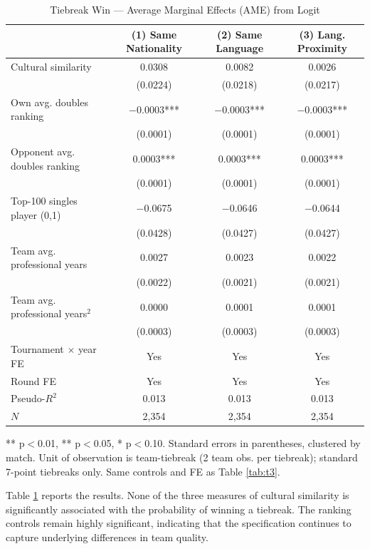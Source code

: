 \documentclass[10pt]{article}
\begin{document}
\begin{table}[htbp]
\color{blue}
\centering
\caption{Tiebreak Win — Average Marginal Effects (AME) from Logit \label{tab:t4}}
\begin{threeparttable}
\begin{tabular}{lccc}
\toprule
 & (1) Same Nationality & (2) Same Language & (3) Lang. Proximity \\
\midrule
Cultural similarity & 0.0308 & 0.0082 & 0.0026 \\
 & (0.0224) & (0.0218) & (0.0217) \\
Own avg. doubles ranking & $-$0.0003*** & $-$0.0003*** & $-$0.0003*** \\
 & (0.0001) & (0.0001) & (0.0001) \\
Opponent avg. doubles ranking & 0.0003*** & 0.0003*** & 0.0003*** \\
 & (0.0001) & (0.0001) & (0.0001) \\
Top-100 singles player (0,1) & $-$0.0675 & $-$0.0646 & $-$0.0644 \\
 & (0.0428) & (0.0427) & (0.0427) \\
Team avg. professional years & 0.0027 & 0.0023 & 0.0022 \\
 & (0.0022) & (0.0021) & (0.0021) \\
Team avg. professional years$^2$ & 0.0000 & 0.0001 & 0.0001 \\
 & (0.0003) & (0.0003) & (0.0003) \\
\midrule
Tournament $\times$ year FE & Yes & Yes & Yes \\
Round FE & Yes & Yes & Yes \\
Pseudo-$R^2$ & 0.013 & 0.013 & 0.013 \\
$N$ & 2,354 & 2,354 & 2,354 \\
\bottomrule
\end{tabular}
\begin{tablenotes}
\small
\item *** p$<$0.01, ** p$<$0.05, * p$<$0.10. Standard errors in parentheses, clustered by match. Unit of observation is team-tiebreak (2 team obs. per tiebreak); standard 7-point tiebreaks only. Same controls and FE as Table \ref{tab:t3}.
\end{tablenotes}
\end{threeparttable}
\end{table}
\FloatBarrier

Table \ref{tab:t4} reports the results. None of the three measures of cultural similarity is significantly associated with the probability of winning a tiebreak.  The ranking controls remain highly significant, indicating that the specification continues to capture underlying differences in team quality.
\end{document}
